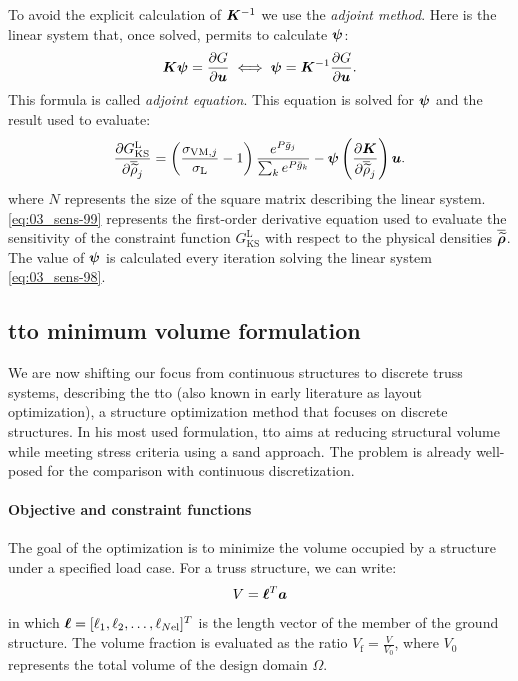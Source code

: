 To avoid the explicit calculation of $\bm{K}^{-1}$ we use the \textit{adjoint method}. Here is the linear system that, once solved, permits to calculate $\bm{\psi}$:
\begin{equation} \label{eq:03_sens-98}
    \bm{K}\bm{\psi} = \frac{\partial G}{\partial\bm{u}} \iff \bm{\psi} = \bm{K}^{-1}\frac{\partial G}{\partial\bm{u}}.
\end{equation}
This formula is called \textit{adjoint equation}. This equation is solved for $\bm{\psi}$ and the result used to evaluate:
\begin{equation}\label{eq:03_sens-99}
\frac{\partial G_{\text{KS}}^\text{L}}{\partial\overline{\widetilde{\rho}}_j} = \left(\frac{ \sigma_{\text{VM},j}}{\sigma_\text{L}}-1 \right) \frac{e^{{P}\bar{g}_j}}{\sum_k e^{{P}\bar{g}_k}} - \bm{\psi} \left(\frac{\partial\bm{K}}{\partial\overline{\widetilde{\rho}}_{j}}\right) \bm{u}.
\end{equation}
 where $N$ represents the size of the square matrix describing the linear system.
\eqref{eq:03_sens-99} represents the first-order derivative equation used to evaluate the sensitivity of the constraint function $G_{\text{KS}}^\text{L}$ with respect to the physical densities $\bm{\overline{\widetilde{\rho}}}$. The value of $\bm{\psi}$ is calculated every iteration solving the linear system \ref{eq:03_sens-98}.

\subsection{\acrfull{tto} minimum volume formulation}
We are now shifting our focus from continuous structures to discrete truss systems, describing the \acrfull{tto} (also known in early literature as layout optimization), a structure optimization method that focuses on discrete structures. In his most used formulation, \gls{tto} aims at reducing structural volume while meeting stress criteria using a \gls{sand} approach. The problem is already well-posed for the comparison with continuous discretization.

\paragraph{Objective and constraint functions} 
The goal of the optimization is to minimize the volume occupied by a structure under a specified load case. For a truss structure, we can write:
\begin{equation}
    V = \bm{\ell}^{T}\bm{a}
\end{equation}
in which $\bm{\ell} = [\ell_1, \ell_2, \ldots,\ell_{N\text{el}}]^T$ is the length vector of the member of the ground structure. The volume fraction is evaluated as the ratio $ V_\text{f} = \frac{V}{V_0}$, where $V_0$ represents the total volume of the design domain $\Omega$.

